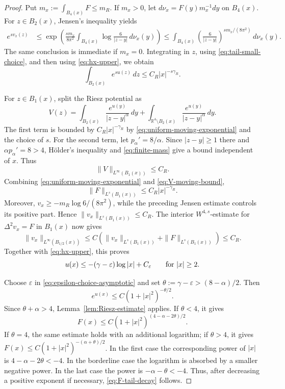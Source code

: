 \documentclass[11pt]{article}
\numberwithin{equation}{section}
\begin{document}
\begin{proof}
Put \(m_{x}:=\int_{B_{4}(x)}F\leq m_{R}\). If \(m_x>0\), let
\(d\nu_x=F(y)m_x^{-1}dy\) on \(B_4(x)\). For \(z\in B_2(x)\), Jensen's inequality yields
\[
\begin{aligned}
e^{s v_x(z)}
&\leq
\exp\left(\frac{s m_x}{8\pi^{2}}
\int_{B_4(x)}\log\frac{6}{|z-y|}\,d\nu_x(y)\right)\leq
\int_{B_4(x)}
\left(\frac{6}{|z-y|}\right)^{s m_x/(8\pi^{2})}
\,d\nu_x(y).
\end{aligned}
\]
The same conclusion is immediate if \(m_x=0\). Integrating in \(z\), using \eqref{eq:tail-small-choice}, and then using \eqref{eq:hx-upper}, we obtain
\begin{equation}\label{eq:uniform-moving-exponential}
\int_{B_{2}(x)}e^{s u(z)}\,dz
\leq C_{R}|x|^{-s\gamma_{R}}.
\end{equation}

For \(z\in B_{1}(x)\), split the Riesz potential as
\[
V(z)=\int_{B_{2}(x)}\frac{e^{u(y)}}{|z-y|^{\alpha}}\,dy
+\int_{\mathbb R^{4}\setminus B_{2}(x)}
\frac{e^{u(y)}}{|z-y|^{\alpha}}\,dy.
\]
The first term is bounded by \(C_R|x|^{-\gamma_R}\) by
\eqref{eq:uniform-moving-exponential} and the choice of \(s\). For the second term, let \(p_{\alpha}'=8/\alpha\). Since \(|z-y|\geq1\) there and \(\alpha p_{\alpha}'=8>4\), H\"older's inequality and \eqref{eq:finite-mass} give a bound independent of \(x\). Thus
\begin{equation}\label{eq:V-moving-bound}
\|V\|_{L^{\infty}(B_{1}(x))}\leq C_{R}.
\end{equation}
Combining \eqref{eq:uniform-moving-exponential} and \eqref{eq:V-moving-bound},
\begin{equation*}
\|F\|_{L^{s}(B_{1}(x))}\leq C_{R}|x|^{-\gamma_{R}}.
\end{equation*}
Moreover, \(v_x\geq-m_R\log 6/(8\pi^{2})\), while the preceding Jensen estimate controls its positive part. Hence \(\|v_x\|_{L^{s}(B_1(x))}\leq C_R\). The interior \(W^{4,s}\)-estimate for
\(\Delta^{2}v_x=F\) in \(B_1(x)\) now gives
\[
\|v_x\|_{L^{\infty}(B_{1/2}(x))}
\leq C\left(\|v_x\|_{L^{s}(B_1(x))}
+\|F\|_{L^{s}(B_1(x))}\right)\leq C_R.
\]
Together with \eqref{eq:hx-upper}, this proves
\begin{equation*}
u(x)\leq-(\gamma-\varepsilon)\log|x|+C_{\varepsilon}
\qquad\hbox{for }|x|\geq2.
\end{equation*}

Choose \(\varepsilon\) in \eqref{eq:epsilon-choice-asymptotic} and set
\(\theta:=\gamma-\varepsilon>(8-\alpha)/2\). Then
\[
e^{u(x)}\leq C(1+|x|^{2})^{-\theta/2}.
\]
Since \(\theta+\alpha>4\), Lemma~\ref{lem:Riesz-estimate} applies. If \(\theta<4\), it gives
\[
F(x)\leq C(1+|x|^{2})^{(4-\alpha-2\theta)/2}.
\]
If \(\theta=4\), the same estimate holds with an additional logarithm; if \(\theta>4\), it gives
\(F(x)\leq C(1+|x|^{2})^{-(\alpha+\theta)/2}\). In the first case the corresponding power of \(|x|\) is
\(4-\alpha-2\theta<-4\). In the borderline case the logarithm is
absorbed by a smaller negative power. In the last case the power is
\(-\alpha-\theta<-4\). Thus, after decreasing a positive exponent if
necessary, \eqref{eq:F-tail-decay} follows.


\end{proof}
\end{document}
